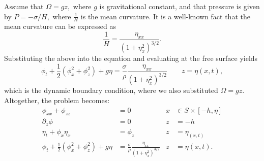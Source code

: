 \documentclass[10pt,reqno,oneside,a4paper]{article}
\begin{document}
Assume that $\Omega = g z,$ where $g$ is gravitational constant, and that pressure is given by $P = -\sigma/H,$ where $\frac{1}{H}$ is the mean curvature. It is a well-known fact that the mean curvature can be expressed as 
\[ 
\frac{1}{H} = \frac{\eta_{xx}}{(1+\eta_x^2)^{3/2}}.
\]
Substituting the above into the equation and evaluating at the free surface yields 
\begin{equation}\label{EE-dynamic}
\phi_t + \frac{1}{2} (\phi_x^2 + \phi_z^2) + g\eta = \frac{\sigma}{\rho} \frac{\eta_{xx}}{(1+\eta_x^2)^{3/2}} \qquad z = \eta(x, t),
\end{equation} 
which is the dynamic boundary condition, where we also substituted $\Omega = gz$. Altogether, the problem becomes:
\begin{align*}
\phi_{xx} + \phi_{zz} &= 0 &x &\in S\times [-h, \eta] \\
\partial_z \phi &= 0 &z &= -h \\
\eta_t + \phi_x \eta_x &= \phi_z &z &= \eta_(x,t) \\
\phi_t + \frac{1}{2} (\phi_x^2 + \phi_z^2) + g\eta &= \frac{\sigma}{\rho} \frac{\eta_{xx}}{(1+\eta_x^2)^{3/2}} &z &= \eta(x, t).
\end{align*}
\end{document}
